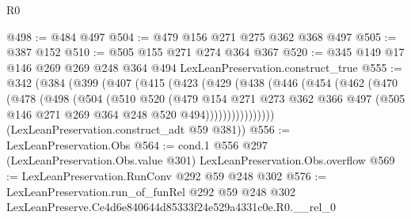 \begin{lexlean}{R0}
\begin{coremodule}
@498 := @484 @497
@504 := @479 @156 @271 @275 @362 @368 @497
@505 := @387 @152
@510 := @505 @155 @271 @274 @364 @367
@520 := @345 @149 @17 @146 @269 @269 @248 @364 @494 LexLeanPreservation.construct_true
@555 := @342
    (@384
      (@399
        (@407
          (@415
            (@423
              (@429
                (@438
                  (@446
                    (@454
                      (@462
                        (@470
                          (@478
                            (@498
                              (@504
                                (@510
                                  @520
                                  (@479
                                    @154
                                    @271
                                    @273
                                    @362
                                    @366
                                    @497
                                    (@505 @146 @271 @269 @364 @248 @520 @494))))))))))))))))
      (LexLeanPreservation.construct_adt @59 @381))
@556 := LexLeanPreservation.Obs
@564 := cond.{1} @556 @297 (LexLeanPreservation.Obs.value @301) LexLeanPreservation.Obs.overflow
@569 := LexLeanPreservation.RunConv @292 @59 @248 @302
@576 := LexLeanPreservation.run_of_funRel
    @292
    @59
    @248
    @302
    LexLeanPreserve.Ce4d6e840644d85333f24e529a4331c0e.R0.__rel_0
\end{coremodule}
\end{lexlean}
